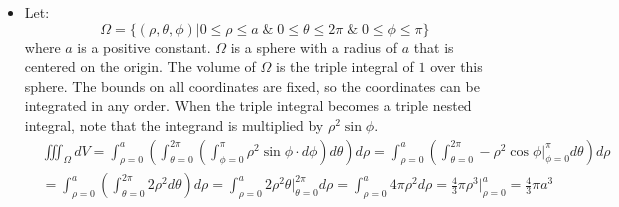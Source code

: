 \documentclass{article}
\begin{document}
\begin{itemize}
\item Let:
\[\Omega = \{(\rho,\theta,\phi) | 0 \leq \rho \leq a \;\&\; 0 \leq \theta \leq 2\pi \;\&\; 0 \leq \phi \leq \pi\}\]
where \(a\) is a positive constant. \(\Omega\) is a sphere with a radius of \(a\) that is centered on the origin. The volume of \(\Omega\) is the triple integral of \(1\) over this sphere. The bounds on all coordinates are fixed, so the coordinates can be integrated in any order. When the triple integral becomes a triple nested integral, note that the integrand is multiplied by \(\rho^2 \sin\phi\). 
\begin{align*}
& \iiint_{\Omega} dV = \int_{\rho = 0}^a \left(\int_{\theta = 0}^{2\pi} \left(\int_{\phi = 0}^{\pi} \rho^2 \sin\phi \cdot d\phi\right)d\theta\right)d\rho 
= \int_{\rho = 0}^a \left(\int_{\theta = 0}^{2\pi} -\rho^2 \cos\phi\Big|_{\phi = 0}^{\pi} d\theta\right)d\rho \\ 
& = \int_{\rho = 0}^a \left(\int_{\theta = 0}^{2\pi} 2\rho^2 d\theta\right)d\rho 
= \int_{\rho = 0}^a 2\rho^2\theta\Big|_{\theta = 0}^{2\pi} d\rho  
= \int_{\rho = 0}^a 4\pi\rho^2 d\rho 
= \frac{4}{3}\pi\rho^3\Big|_{\rho = 0}^a 
= \frac{4}{3}\pi a^3
\end{align*}



\end{itemize}
\end{document}
